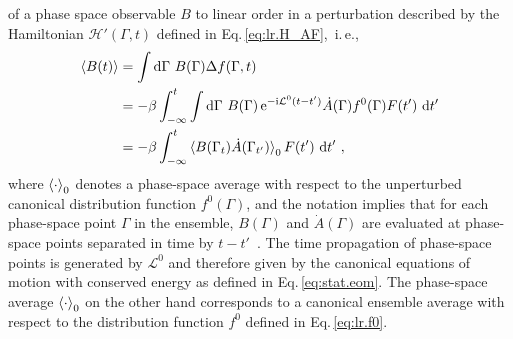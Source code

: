  of a phase space observable $B$ to linear order in a perturbation described by the Hamiltonian $\mathcal H'(\Gamma, t)$ defined in Eq.\,\eqref{eq:lr.H_AF},~i.\,e.,~
\begin{align}
\braket{B (t)}
    &= \int \d \Gamma ~  B (\Gamma) \Delta f (\Gamma, t) \\
    &= - \beta \int_{-\infty}^t 
      \int \d \Gamma ~  
       B (\Gamma) \, {\rm e}^{-\im \mathcal L^0 (t - t')} \dot{A}(\Gamma)
       f^0(\Gamma) F(t') ~ \d t' \\
    &= - \beta \int_{-\infty}^t 
      \braket{B(\Gamma_t) \dot{A} (\Gamma_{t'})}_{0} F(t') ~ \d t'~,
  \label{eq:app.lr.dB}
\end{align}
where $\braket{\cdot}_{0}$ denotes a phase-space average with respect to the unperturbed canonical distribution function $f^0 (\Gamma)$, and the notation implies that for each phase-space point $\Gamma$ in the ensemble, $B (\Gamma)$ and $\dot{A} (\Gamma)$ are evaluated at phase-space points separated in time by $t-t'$~\cite[p.\,498]{Tuckerman}.
The time propagation of phase-space points is generated by $\mathcal L^0$ and therefore given by the canonical equations of motion with conserved energy as defined in Eq.\,\eqref{eq:stat.eom}. The phase-space average $\braket{\cdot}_{0}$ on the other hand corresponds to a canonical ensemble average with respect to the distribution function $f^0$ defined in Eq.\,\eqref{eq:lr.f0}.


